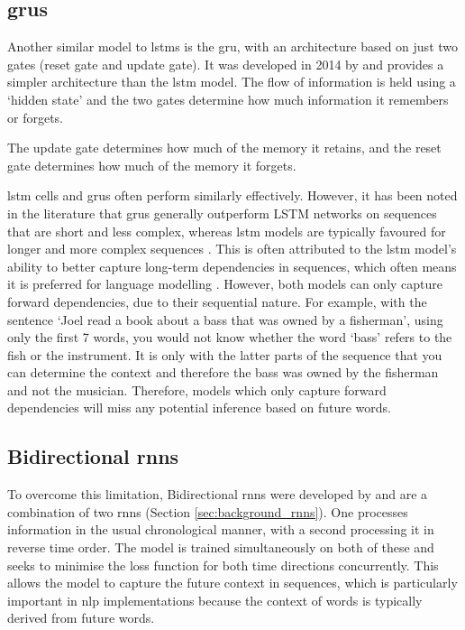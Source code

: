 \subsection{\acrlong{gru}s}
\label{sec:background_grus}
Another similar model to \acrshort{lstm}s is the \acrfull {gru}, with an architecture based on just two gates (reset gate and update gate). It was developed in 2014 by \citet{cho2014learning} and provides a simpler architecture than the \acrshort{lstm} model. The flow of information is held using a `hidden state' and the two gates determine how much information it remembers or forgets.

The update gate determines how much of the memory it retains, and the reset gate determines how much of the memory it forgets.

\acrlong{lstm} cells and \acrlong{gru}s often perform similarly effectively. However, it has been noted in the literature that \acrshort{gru}s generally outperform LSTM networks on sequences that are short and less complex, whereas \acrshort{lstm} models are typically favoured for longer and more complex sequences \citep{cahuantzi2023comparison}. This is often attributed to the \acrshort{lstm} model's ability to better capture long-term dependencies in sequences, which often means it is preferred for language modelling \citep{Irie2016}. However, both models can only capture forward dependencies, due to their sequential nature. For example, with the sentence `Joel read a book about a bass that was owned by a fisherman', using only the first 7 words, you would not know whether the word `bass' refers to the fish or the instrument. It is only with the latter parts of the sequence that you can determine the context and therefore the bass was owned by the fisherman and not the musician. Therefore, models which only capture forward dependencies will miss any potential inference based on future words. 

\subsection{Bidirectional \acrlong{rnn}s}
\label{sec:background_bidirectional_rnns}
To overcome this limitation, Bidirectional \acrshort{rnn}s were developed by \citet{Schuster} and are a combination of two \acrshort{rnn}s (Section \ref{sec:background_rnns}). One processes information in the usual chronological manner, with a second processing it in reverse time order. The model is trained simultaneously on both of these and seeks to minimise the loss function for both time directions concurrently. This allows the model to capture the future context in sequences, which is particularly important in \acrshort{nlp} implementations because the context of words is typically derived from future words.

